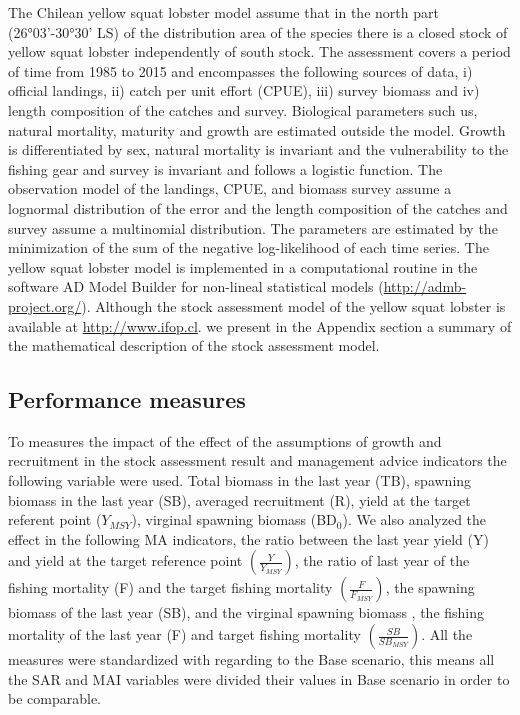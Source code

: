 \documentclass[11pt,letterpaper,]{article}
\begin{document}
The Chilean yellow squat lobster model assume that in the north part
(26°03'-30°30' LS) of the distribution area of the species there is a
closed stock of yellow squat lobster independently of south stock. The
assessment covers a period of time from 1985 to 2015 and encompasses the
following sources of data, i) official landings, ii) catch per unit
effort (CPUE), iii) survey biomass and iv) length composition of the
catches and survey. Biological parameters such us, natural mortality,
maturity and growth are estimated outside the model. Growth is
differentiated by sex, natural mortality is invariant and the
vulnerability to the fishing gear and survey is invariant and follows a
logistic function. The observation model of the landings, CPUE, and
biomass survey assume a lognormal distribution of the error and the
length composition of the catches and survey assume a multinomial
distribution. The parameters are estimated by the minimization of the
sum of the negative log-likelihood of each time series. The yellow squat
lobster model is implemented in a computational routine in the software
AD Model Builder for non-lineal statistical models
(\url{http://admb-project.org/}). Although the stock assessment model of
the yellow squat lobster is available at \url{http://www.ifop.cl}. we
present in the Appendix section a summary of the mathematical
description of the stock assessment model.

\subsection{Performance measures}\label{performance-measures}

To measures the impact of the effect of the assumptions of growth and
recruitment in the stock assessment result and management advice
indicators the following variable were used. Total biomass in the last
year (TB), spawning biomass in the last year (SB), averaged recruitment
(R), yield at the target referent point (\(Y_{MSY}\)), virginal spawning
biomass (BD\(_0\)). We also analyzed the effect in the following MA
indicators, the ratio between the last year yield (Y) and yield at the
target reference point \(\left(\frac{Y}{Y_{MSY}}\right)\), the ratio of
last year of the fishing mortality (F) and the target fishing mortality
\(\left(\frac{F}{F_{MSY}}\right)\), the spawning biomass of the last
year (SB), and the virginal spawning biomass , the fishing mortality of
the last year (F) and target fishing mortality
\(\left(\frac{SB}{SB_{MSY}}\right)\). All the measures were standardized
with regarding to the Base scenario, this means all the SAR and MAI
variables were divided their values in Base scenario in order to be
comparable.
\end{document}

